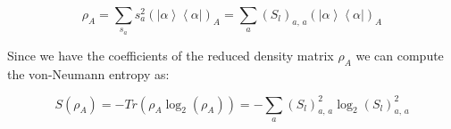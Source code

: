 \documentclass[12pt, a4paper, twoside, titlepage]{article}
\newcommand{\ket}[1]{\ensuremath{\left|#1\right\rangle}}
\newcommand{\bra}[1]{\ensuremath{\left\langle#1\right|}}
\begin{document}
\begin{equation}\label{eq:canonical_rho_a}
\rho_A =  \sum_{s_a} s^2_a  \left( \ket{\alpha} \bra{\alpha}\right)_A= \sum_a \left( S_{l} \right)_{a, \,a} \left( \ket{\alpha} \bra{\alpha}\right)_A
\end{equation}

Since we have the coefficients of the reduced density matrix $\rho_A$ we can compute the von-Neumann entropy as:


\begin{equation}\label{eq:derived_entropy}
S(\rho_A)=-Tr(\rho_A\log_2(\rho_A))= -\sum_a \left( S_{l} \right)_{a, \,a}^2 \log_2 \left( S_{l} \right)_{a, \,a}^2
\end{equation}
\end{document}
